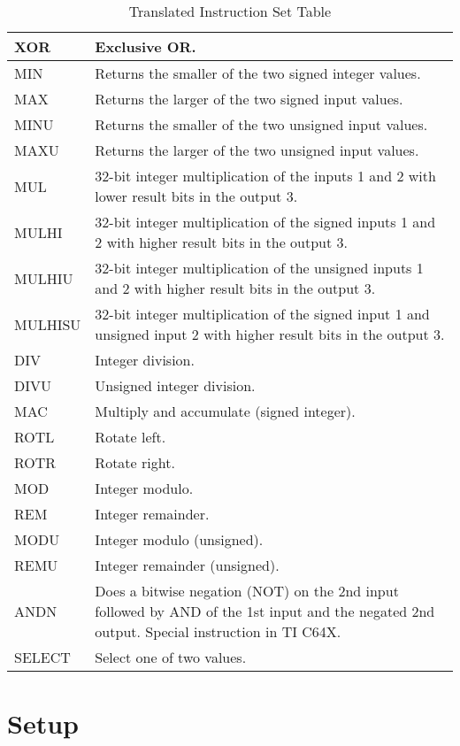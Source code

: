 \begin{table}[htbp]
\begin{tabularx}{\textwidth}{|l|X|}
    XOR & Exclusive OR.  \\ \hline
    MIN & Returns the smaller of the two signed integer values.  \\ \hline
    MAX & Returns the larger of the two signed input values.  \\ \hline
    MINU & Returns the smaller of the two unsigned input values. \\ \hline
    MAXU & Returns the larger of the two unsigned input values. \\ \hline
    MUL & 32-bit integer multiplication of the inputs 1 and 2 with lower result bits in the output 3. \\ \hline
    MULHI & 32-bit integer multiplication of the signed inputs 1 and 2 with higher result bits in the output 3. \\ \hline
    MULHIU & 32-bit integer multiplication of the unsigned inputs 1 and 2 with higher result bits in the output 3. \\ \hline
    MULHISU & 32-bit integer multiplication of the signed input 1 and unsigned input 2 with higher result bits in the output 3. \\ \hline
    DIV & Integer division. \\ \hline
    DIVU & Unsigned integer division. \\ \hline
    MAC & Multiply and accumulate (signed integer). \\ \hline
    ROTL & Rotate left. \\ \hline
    ROTR & Rotate right. \\ \hline
    MOD & Integer modulo. \\ \hline
    REM & Integer remainder. \\ \hline
    MODU & Integer modulo (unsigned). \\ \hline
    REMU & Integer remainder (unsigned). \\ \hline
    ANDN & Does a bitwise negation (NOT) on the 2nd input followed by AND of the 1st input and the negated 2nd output. Special instruction in TI C64X. \\ \hline
    SELECT & Select one of two values. \\ \hline
    \end{tabularx}
    \caption{Translated Instruction Set Table}
    \label{tab:translated_instructions}
\end{table}

\section{Setup}


